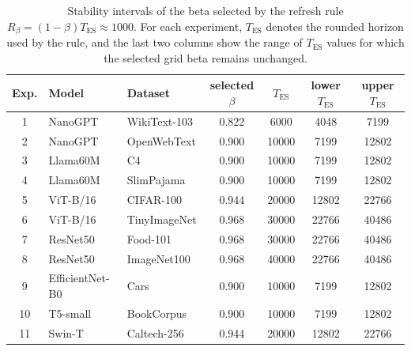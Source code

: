 \begin{table}[ht]
\centering
\small
\caption{Stability intervals of the beta selected by the refresh rule \(R_\beta=(1-\beta)T_{\mathrm{ES}}\approx1000\). For each experiment, \(T_{\mathrm{ES}}\) denotes the rounded horizon used by the rule, and the last two columns show the range of \(T_{\mathrm{ES}}\) values for which the selected grid beta remains unchanged.}
\label{tab:beta-stability-intervals}
\setlength{\tabcolsep}{4pt}
\begin{tabular*}{\textwidth}{@{\extracolsep{\fill}}cllcccc}
\toprule
Exp. & Model & Dataset & selected \(\beta\) & \(T_{\mathrm{ES}}\) & lower \(T_{\mathrm{ES}}\) & upper \(T_{\mathrm{ES}}\) \\
\midrule
1 & NanoGPT & WikiText-103 & 0.822 & 6000 & 4048 & 7199 \\
2 & NanoGPT & OpenWebText & 0.900 & 10000 & 7199 & 12802 \\
3 & Llama60M & C4 & 0.900 & 10000 & 7199 & 12802 \\
4 & Llama60M & SlimPajama & 0.900 & 10000 & 7199 & 12802 \\
5 & ViT-B/16 & CIFAR-100 & 0.944 & 20000 & 12802 & 22766 \\
6 & ViT-B/16 & TinyImageNet & 0.968 & 30000 & 22766 & 40486 \\
7 & ResNet50 & Food-101 & 0.968 & 30000 & 22766 & 40486 \\
8 & ResNet50 & ImageNet100 & 0.968 & 40000 & 22766 & 40486 \\
\midrule
9 & EfficientNet-B0 & Cars & 0.900 & 10000 & 7199 & 12802 \\
10 & T5-small & BookCorpus & 0.900 & 10000 & 7199 & 12802 \\
11 & Swin-T & Caltech-256 & 0.944 & 20000 & 12802 & 22766 \\
\bottomrule
\end{tabular*}
\end{table}

